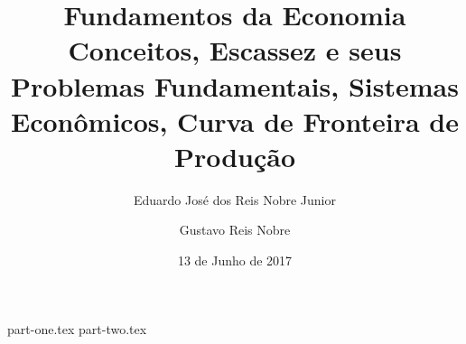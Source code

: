 \documentclass[12pt, a4paper, titlepage]{article}
\title{Fundamentos da Economia \\ \normalsize Conceitos, Escassez e seus Problemas Fundamentais, Sistemas Econômicos, Curva de Fronteira de Produção\vspace{30ex}}
\author{Eduardo José dos Reis Nobre Junior \and Gustavo Reis Nobre\vspace{30ex}}
\date{13 de Junho de 2017}
\begin{document}
  \maketitle
  \clearpage
  \tableofcontents
  {part-one.tex}
  {part-two.tex}
\end{document}
